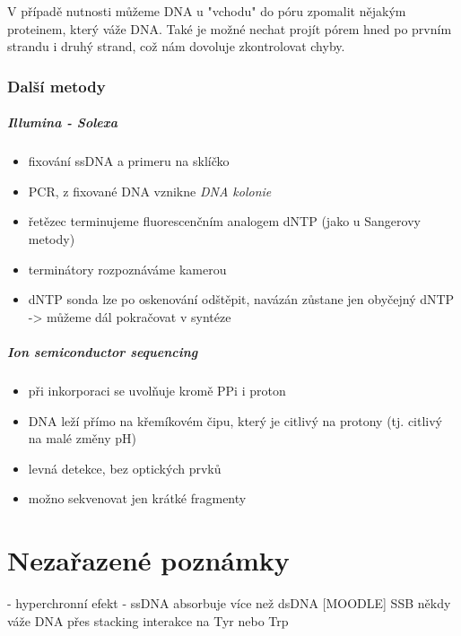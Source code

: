 \documentclass[DIV=8]{scrreprt}
\begin{document}
V případě nutnosti můžeme DNA u "vchodu" do póru zpomalit nějakým proteinem, který váže DNA. Také je možné nechat projít pórem hned po prvním strandu i druhý strand, což nám dovoluje zkontrolovat chyby.

\subsection{Další metody} \label{Další metody}


\paragraph{Illumina - Solexa}
\begin{itemize}[nosep]
    \item fixování ssDNA a primeru na sklíčko
    \item PCR, z fixované DNA vznikne \emph{DNA kolonie}
    \item řetězec terminujeme fluorescenčním analogem dNTP (jako u Sangerovy metody)
    \item terminátory rozpoznáváme kamerou
    \item dNTP sonda lze po oskenování odštěpit, navázán zůstane jen obyčejný dNTP -> můžeme dál pokračovat v syntéze
\end{itemize}



\paragraph{Ion semiconductor sequencing}
\begin{itemize}[nosep]
    \item při inkorporaci se uvolňuje kromě PPi i proton
    \item DNA leží přímo na křemíkovém čipu, který je citlivý na protony (tj. citlivý na malé změny pH)
    \item levná detekce, bez optických prvků
    \item možno sekvenovat jen krátké fragmenty
\end{itemize}



\chapter{Nezařazené poznámky} \label{Nezařazené poznámky}

- hyperchronní efekt - ssDNA absorbuje více než dsDNA
[MOODLE] SSB někdy váže DNA přes stacking interakce na Tyr nebo Trp
\end{document}
